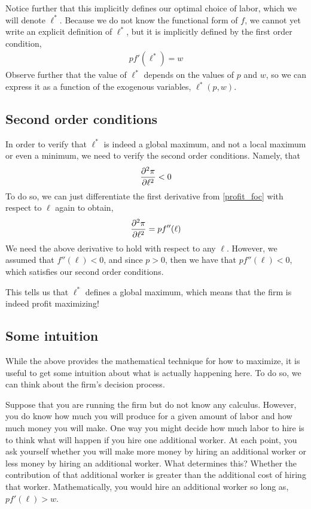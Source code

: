 Notice further that this implicitly defines our optimal choice of labor, which we will denote $\ell^*$. Because we do not know the functional form of $f$, we cannot yet write an explicit definition of $\ell^*$, but it is implicitly defined by the first order condition,
\begin{align}
    p f'(\ell^*) = w
\end{align}
Observe further that the value of $\ell^*$ depends on the values of $p$ and $w$, so we can express it as a function of the exogenous variables, $\ell^*(p, w)$. 

\subsection{Second order conditions}
In order to verify that $\ell^*$ is indeed a global maximum, and not a local maximum or even a minimum, we need to verify the second order conditions. Namely, that
\begin{align*}
    \frac{\partial ^2\pi}{\partial \ell^2} < 0
\end{align*}
To do so, we can just differentiate the first derivative from \ref{profit_foc} with respect to $\ell$ again to obtain, 
\begin{align}
    \frac{\partial ^2\pi}{\partial \ell^2} = pf''(\ell)
\end{align}
We need the above derivative to hold with respect to any $\ell$. However, we assumed that $f''(\ell) < 0$, and since $p > 0$, then we have that $pf''(\ell) < 0$, which satisfies our second order conditions.

This tells us that $\ell^*$ defines a global maximum, which means that the firm is indeed profit maximizing! 

\subsection{Some intuition}
While the above provides the mathematical technique for how to maximize, it is useful to get some intuition about what is actually happening here. To do so, we can think about the firm's decision process.

Suppose that you are running the firm but do not know any calculus. However, you do know how much you will produce for a given amount of labor and how much money you will make. One way you might decide how much labor to hire is to think what will happen if you hire one additional worker. At each point, you ask yourself whether you will make more money by hiring an additional worker or less money by hiring an additional worker. What determines this? Whether the contribution of that additional worker is greater than the additional cost of hiring that worker. Mathematically, you would hire an additional worker so long as, $p f'(\ell) > w$. 

